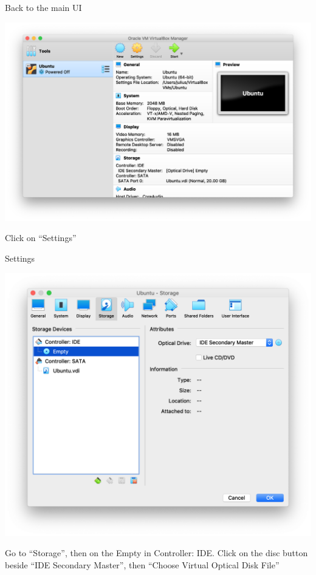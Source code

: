 \documentclass[12pt]{beamer}
\begin{document}
\begin{frame}{Back to the main UI}
  \begin{center}
    \includegraphics[width=0.8\linewidth]{vb-main2}
  \end{center}
  Click on ``Settings''
\end{frame}

\begin{frame}{Settings}
  \begin{center}
    \includegraphics[width=0.8\linewidth]{vb-settings}
  \end{center}
  Go to ``Storage'', then on the Empty in Controller: IDE. Click on the disc button beside ``IDE Secondary Master'', then ``Choose Virtual Optical Disk File''
\end{frame}
\end{document}
